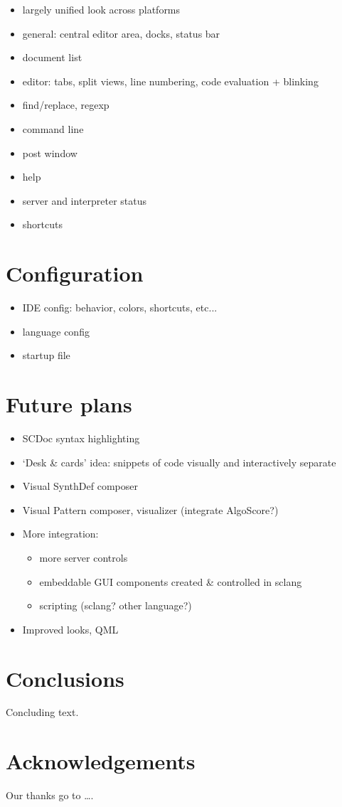 \documentclass[11pt,a4paper]{article}
\begin{document}
\begin{itemize}
 \item largely unified look across platforms
 \item general: central editor area, docks, status bar
 \item document list
 \item editor: tabs, split views, line numbering, code evaluation + blinking
 \item find/replace, regexp
 \item command line
 \item post window
 \item help
 \item server and interpreter status
 \item shortcuts
\end{itemize}

\section{Configuration}

\begin{itemize}
 \item IDE config: behavior, colors, shortcuts, etc...
 \item language config
 \item startup file
\end{itemize}


\section{Future plans}

\begin{itemize}
 \item SCDoc syntax highlighting
 \item `Desk \& cards' idea: snippets of code visually and interactively separate
 \item Visual SynthDef composer
 \item Visual Pattern composer, visualizer (integrate AlgoScore?)
 \item More integration:
 \begin{itemize}
    \item more server controls
    \item  embeddable GUI components created \& controlled in sclang
    \item  scripting (sclang? other language?)
 \end{itemize}
 \item Improved looks, QML
\end{itemize}

\section{Conclusions}

Concluding text.

\section{Acknowledgements}

Our thanks go to \ldots .



\end{document}

